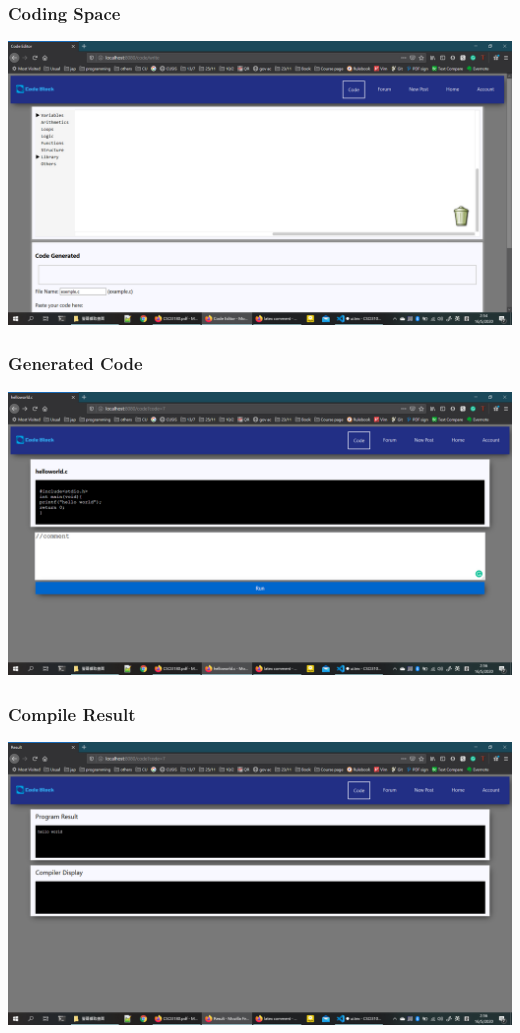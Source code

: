 \subsubsection{Coding Space}
\includegraphics[scale=0.45]{Doc/Pics/code.png}
\subsubsection{Generated Code}
\includegraphics[scale=0.45]{Doc/Pics/generated_code.png}
\subsubsection{Compile Result}
\includegraphics[scale=0.45]{Doc/Pics/compile_result.png}

